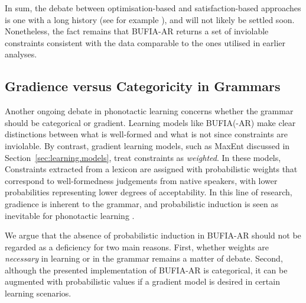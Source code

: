 In sum, the debate between optimisation-based and satisfaction-based
approaches is one with a long history (see for example
\citet{Simon1956}), and will not likely be settled soon. Nonetheless,
the fact remains that BUFIA-AR returns a set of inviolable constraints
consistent with the data comparable to the ones utilised in earlier
analyses.

\subsection{Gradience versus Categoricity in Grammars}
\label{sec:discussion.grammar}

Another ongoing debate in phonotactic learning concerns whether the
grammar should be categorical or gradient. Learning models like
BUFIA(-AR) make clear distinctions between what is well-formed and
what is not since constraints are inviolable. By contrast, gradient
learning models, such as MaxEnt \citep{hayes2008maximum, GouskovaGallagher2020} discussed in Section~\ref{sec:learning.models},
treat constraints as \textit{weighted}. In these models,
Constraints extracted from a lexicon are assigned with probabilistic weights that correspond to well-formedness judgements
from native speakers, with lower probabilities representing lower degrees
of acceptability. In this line of research, gradience is inherent to
the grammar, and probabilistic induction is seen as inevitable for
phonotactic learning \citep{hayes2008maximum, wilson2018accidental}.

We argue that the absence of probabilistic induction in BUFIA-AR
should not be regarded as a deficiency for two main reasons.  First,
whether weights are \textit{necessary} in learning or in the grammar
remains a matter of debate. Second, although the presented
implementation of BUFIA-AR is categorical, it can be augmented with
probabilistic values if a gradient model is desired in certain
learning scenarios.

